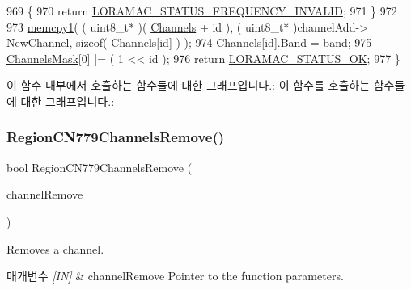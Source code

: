 \begin{DoxyCode}
969     \{
970         \textcolor{keywordflow}{return} \mbox{\hyperlink{group___l_o_r_a_m_a_c_gga1d18f26b344040b3ec5c3db662919661ae3ea7b89796aed5a320013d9743b2955}{LORAMAC\_STATUS\_FREQUENCY\_INVALID}};
971     \}
972 
973     \mbox{\hyperlink{utilities_8c_abfbe672c7136122f16c9214bc4ba8d21}{memcpy1}}( ( uint8\_t* )( \mbox{\hyperlink{_region_c_n779_8c_ad43b16563c3a87159ec34d1db860a3da}{Channels}} + \textcolor{keywordtype}{id} ), ( uint8\_t* )channelAdd->
      \mbox{\hyperlink{structs_channel_add_params_afc31493a105479490228fd896b20b45c}{NewChannel}}, \textcolor{keyword}{sizeof}( \mbox{\hyperlink{_region_c_n779_8c_ad43b16563c3a87159ec34d1db860a3da}{Channels}}[\textcolor{keywordtype}{id}] ) );
974     \mbox{\hyperlink{_region_c_n779_8c_ad43b16563c3a87159ec34d1db860a3da}{Channels}}[id].\mbox{\hyperlink{structs_channel_params_a724c03aa06953111c3291243831f251b}{Band}} = band;
975     \mbox{\hyperlink{_region_c_n779_8c_a2188957b5ca6af8092154d7ccbfa5757}{ChannelsMask}}[0] |= ( 1 << id );
976     \textcolor{keywordflow}{return} \mbox{\hyperlink{group___l_o_r_a_m_a_c_gga1d18f26b344040b3ec5c3db662919661a03db5fca052313edb3823c014b653a74}{LORAMAC\_STATUS\_OK}};
977 \}
\end{DoxyCode}
이 함수 내부에서 호출하는 함수들에 대한 그래프입니다.\+:
이 함수를 호출하는 함수들에 대한 그래프입니다.\+:
\mbox{\label{group___r_e_g_i_o_n_c_n779_ga3ea3d4f5fe7cb25f562f4e6f95396eed}} 
\subsubsection{\texorpdfstring{Region\+C\+N779\+Channels\+Remove()}{RegionCN779ChannelsRemove()}}
{\footnotesize\ttfamily bool Region\+C\+N779\+Channels\+Remove (\begin{DoxyParamCaption}\item[{\mbox{\hyperlink{group___r_e_g_i_o_n_gaa37468560d2fc81a977b57a48e5d72c0}{Channel\+Remove\+Params\+\_\+t}} $\ast$}]{channel\+Remove }\end{DoxyParamCaption})}



Removes a channel. 


\begin{DoxyParams}{매개변수}
{\em \mbox{[}\+I\+N\mbox{]}} & channel\+Remove Pointer to the function parameters.\\
\hline
\end{DoxyParams}

